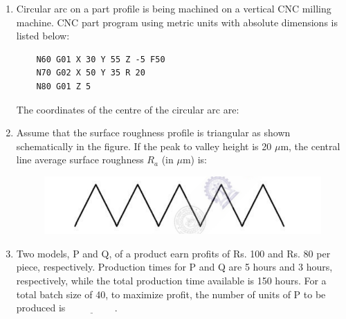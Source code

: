 \documentclass[journal]{IEEEtran}
\begin{document}
\begin{enumerate}[leftmargin=0pt]
    \item Circular arc on a part profile is being machined on a vertical CNC milling machine. CNC part program using metric units with absolute dimensions is listed below:
    \hfill{}
    \begin{verbatim}
    N60 G01 X 30 Y 55 Z -5 F50
    N70 G02 X 50 Y 35 R 20
    N80 G01 Z 5
    \end{verbatim}
    The coordinates of the centre of the circular arc are:
    \begin{enumerate}
    \end{enumerate}

    \item Assume that the surface roughness profile is triangular as shown schematically in the figure. If the peak to valley height is 20 $\mu$m, the central line average surface roughness $R_a$ (in $\mu$m) is:
    \hfill{}
    \begin{figure}[h]
    \centering
    \includegraphics[width=0.5\columnwidth]{Figs/image (30).png}
    \caption*{}
    \label{fig:50}
    \end{figure}
    \begin{enumerate}
    \end{enumerate}

    \item Two models, P and Q, of a product earn profits of Rs. 100 and Rs. 80 per piece, respectively. Production times for P and Q are 5 hours and 3 hours, respectively, while the total production time available is 150 hours. For a total batch size of 40, to maximize profit, the number of units of P to be produced is $\underline{\hspace{2cm}}$.
    \hfill{}


\end{enumerate}
\end{document}
